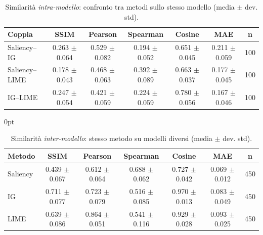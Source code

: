\documentclass[12pt,a4paper,oneside]{report}
\numberwithin{figure}{chapter}
\numberwithin{table}{chapter}
\newenvironment{tabindent}[1][\parindent]{%
  \begin{table}[H]\begin{adjustwidth}{#1}{0pt}\centering}{%
  \end{adjustwidth}\end{table}}
\begin{document}
\begin{table}[H]
      \centering
      \renewcommand{\arraystretch}{1.05}
      \begin{adjustbox}{max width=\linewidth}
            \begin{tabular}{lccccc c}
                  \hline
                  \textbf{Coppia} & \textbf{SSIM}     & \textbf{Pearson}  & \textbf{Spearman} & \textbf{Cosine}   & \textbf{MAE}      & \textbf{n} \\
                  \hline
                  Saliency–IG     & 0.263 $\pm$ 0.064 & 0.529 $\pm$ 0.082 & 0.194 $\pm$ 0.052 & 0.651 $\pm$ 0.045 & 0.211 $\pm$ 0.059 & 100        \\
                  Saliency–LIME   & 0.178 $\pm$ 0.043 & 0.468 $\pm$ 0.063 & 0.392 $\pm$ 0.089 & 0.663 $\pm$ 0.037 & 0.177 $\pm$ 0.045 & 100        \\
                  IG–LIME         & 0.247 $\pm$ 0.054 & 0.421 $\pm$ 0.059 & 0.224 $\pm$ 0.059 & 0.780 $\pm$ 0.056 & 0.167 $\pm$ 0.046 & 100        \\
                  \hline
            \end{tabular}
      \end{adjustbox}
      \caption{Similarità \emph{intra-modello}: confronto tra metodi sullo stesso modello (media $\pm$ dev. std).}
      \label{tab:sim_intra}
\end{table}

\vspace{-0.3\baselineskip}

\begin{tabindent}
      \renewcommand{\arraystretch}{1.1}
      \begin{adjustbox}{max width=\linewidth}
            \begin{tabular}{lccccc c}
                  \hline
                  \textbf{Metodo} & \textbf{SSIM}     & \textbf{Pearson}  & \textbf{Spearman} & \textbf{Cosine}   & \textbf{MAE}      & \textbf{n} \\
                  \hline
                  Saliency        & 0.439 $\pm$ 0.067 & 0.612 $\pm$ 0.064 & 0.688 $\pm$ 0.062 & 0.727 $\pm$ 0.042 & 0.069 $\pm$ 0.012 & 450        \\
                  IG              & 0.711 $\pm$ 0.077 & 0.723 $\pm$ 0.079 & 0.516 $\pm$ 0.085 & 0.970 $\pm$ 0.013 & 0.083 $\pm$ 0.049 & 450        \\
                  LIME            & 0.639 $\pm$ 0.086 & 0.864 $\pm$ 0.051 & 0.541 $\pm$ 0.116 & 0.929 $\pm$ 0.028 & 0.093 $\pm$ 0.025 & 450        \\
                  \hline
            \end{tabular}
      \end{adjustbox}
      \caption{Similarità \emph{inter-modello}: stesso metodo su modelli diversi (media $\pm$ dev. std).}
      \label{tab:sim_inter}
\end{tabindent}
\end{document}

